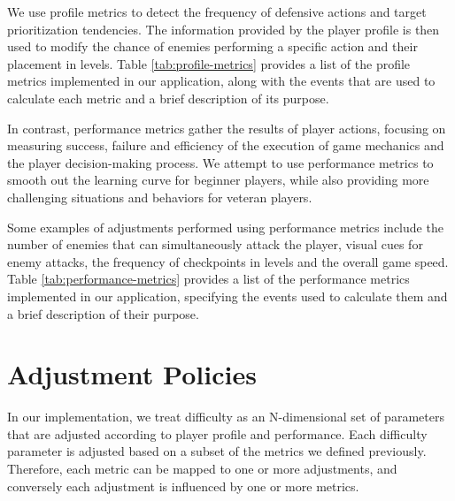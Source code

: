 We use profile metrics to detect the frequency of defensive actions and target prioritization tendencies. The information provided by the player profile is then used to modify the chance of enemies performing a specific action and their placement in levels.  Table \ref{tab:profile-metrics} provides a list of the profile metrics implemented in our application, along with the events that are used to calculate each metric and a brief description of its purpose.




In contrast, performance metrics gather the results of player actions, focusing on measuring success, failure and efficiency of the execution of game mechanics and the player decision-making process. We attempt to use performance metrics to smooth out the learning curve for beginner players, while also providing more challenging situations and behaviors for veteran players.

Some examples of adjustments performed using performance metrics include the number of enemies that can simultaneously attack the player, visual cues for enemy attacks, the frequency of checkpoints in levels and the overall game speed. Table \ref{tab:performance-metrics} provides a list of the performance metrics implemented in our application, specifying the events used to calculate them and a brief description of their purpose.




\section{Adjustment Policies}
\label{sec:adjustments}

In our implementation, we treat difficulty as an N-dimensional set of parameters that are adjusted according to player profile and performance. Each difficulty parameter is adjusted based on a subset of the metrics we defined previously. Therefore, each metric can be mapped to one or more adjustments, and conversely each adjustment is influenced by one or more metrics.

